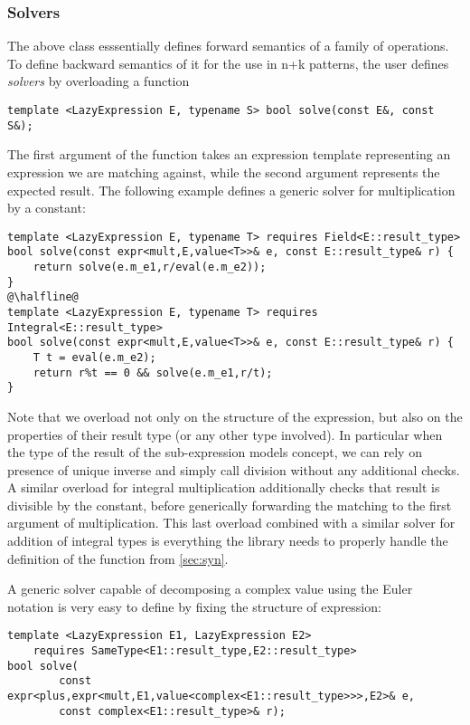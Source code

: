 \subsubsection{Solvers}

The above class esssentially defines forward semantics of a family of 
operations. To define backward semantics of it for the use in n+k patterns, the 
user defines \emph{solvers} by overloading a function 

\begin{lstlisting}
template <LazyExpression E, typename S> bool solve(const E&, const S&);
\end{lstlisting}

The first argument of the function takes an expression template representing an 
expression we are matching against, while the second argument represents the 
expected result. The following example defines a generic solver for 
multiplication by a constant:

\begin{lstlisting}[keepspaces]
template <LazyExpression E, typename T> requires Field<E::result_type>
bool solve(const expr<mult,E,value<T>>& e, const E::result_type& r) {
    return solve(e.m_e1,r/eval(e.m_e2));
}
@\halfline@
template <LazyExpression E, typename T> requires Integral<E::result_type>
bool solve(const expr<mult,E,value<T>>& e, const E::result_type& r) {
    T t = eval(e.m_e2);
    return r%t == 0 && solve(e.m_e1,r/t);
}
\end{lstlisting}

\noindent
Note that we overload not only on the structure of the expression, but also on 
the properties of their result type (or any other type involved). In particular 
when the type of the result of the sub-expression models  concept, 
we can rely on presence of unique inverse and simply call division without any 
additional checks. A similar overload for integral multiplication additionally 
checks that result is divisible by the constant, before generically forwarding 
the matching to the first argument of multiplication. This last overload 
combined with a similar solver for addition of integral types is everything the 
library needs to properly handle the definition of the  function from 
\textsection\ref{sec:syn}.

A generic solver capable of decomposing a complex value using the Euler 
notation is very easy to define by fixing the structure of expression:

\begin{lstlisting}[keepspaces]
template <LazyExpression E1, LazyExpression E2> 
    requires SameType<E1::result_type,E2::result_type>
bool solve(
        const expr<plus,expr<mult,E1,value<complex<E1::result_type>>>,E2>& e, 
        const complex<E1::result_type>& r);
\end{lstlisting}

